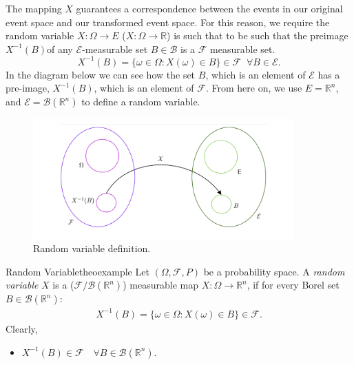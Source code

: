 \documentclass{tufte-handout}
\begin{document}
The mapping  $X$  guarantees a  correspondence between the events in our original event space 
 and our transformed event space. For this reason, we require the random variable $X: \Omega \rightarrow E $ ($X: \Omega \rightarrow \mathbb R $) is such that to be such that the preimage 
 $X^{-1}(B)$of any  $\mathcal E$-measurable set $B\in \mathcal B$ is a $\mathcal F$ measurable set.
\begin{equation*}
X^{-1}(B) = \{\omega \in \Omega: X(\omega) \in B \} \in \mathcal F \;\; \forall B \in \mathcal E.
\end{equation*}
In the diagram below we can see how the set $B$, which is an element of $\mathcal E$
 has a pre-image,  $X^{-1}(B)$, which is an element of $\mathcal F$. From here on, we use $E = \mathbb R^n$, and $\mathcal E = \mathcal B(\mathbb R^n)$ to define a random variable.
 \begin{figure}
\centering
\includegraphics[width=10cm]{fig/rv.png}
\caption{Random variable definition.
}
\end{figure}

\begin{mydef}{Random Variable}{theoexample} 
Let $(\Omega, \mathscr F, P)$ be a probability space.  A  \textit{random variable} $X$  is a   ($\mathcal F/\mathcal B(\mathbb R^n)$) measurable map  $X:\Omega \rightarrow \mathbb R^n$, if for every Borel set  $B \in \mathcal B(\mathbb R^n)$:
\begin{align*}
X^{-1}(B) =\{ \omega \in \Omega: X(\omega) \in B \} \in \mathscr F.
\end{align*}
Clearly,  
\begin{itemize}
\item $X^{-1}(B)\in \mathscr F \,\,\,\,\,\,\forall B\in \mathcal B(\mathbb R^n)$. %
\end{itemize}
\end{mydef}
\end{document}
